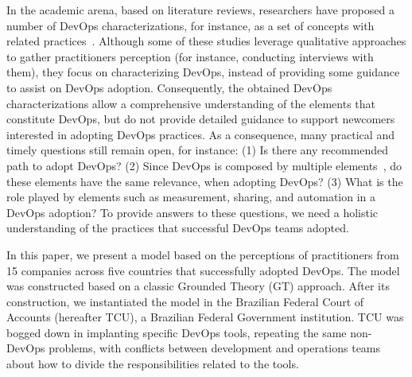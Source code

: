In the academic arena, based on literature reviews, researchers have proposed a
number of DevOps characterizations, for instance, as a set of concepts with
related
practices~\cite{cooperation_dev_ops_esem_2014,devops_a_definition_xp_15,dimensions_of_devops_xp_15,extending_dimensions_icsea_16,characterizing_devops_sbes_2016,qualitative_devops_journalsw_17}. Although some
of these studies leverage qualitative approaches to gather practitioners perception (for instance,
conducting interviews with them), they focus on characterizing DevOps,
instead of providing some guidance to assist on DevOps adoption. Consequently,
the obtained DevOps characterizations allow a comprehensive understanding of
the elements that constitute DevOps, but do not provide detailed guidance to
support newcomers interested in adopting DevOps practices.
As a consequence, many practical and timely questions still remain open, for
instance: (1) Is there any recommended path to adopt DevOps? (2) Since
DevOps is composed by multiple elements~\cite{dimensions_of_devops_xp_15}, do
these elements have the same relevance, when adopting DevOps?
(3) What is the role played by elements such as measurement, sharing, and automation
in a DevOps adoption? To provide answers to these questions, we need a holistic
understanding of the practices that successful DevOps teams adopted.

In this paper, we present a model based on the perceptions of practitioners from
15 companies across five countries that successfully adopted DevOps. The model
was constructed based on a classic Grounded Theory (GT) approach. After its
construction, we instantiated the model in the Brazilian Federal Court of
Accounts (hereafter TCU), a Brazilian Federal Government institution. TCU was
bogged down in implanting specific DevOps tools, repeating the same non-DevOps
problems, with conflicts between development and operations teams about how to
divide the responsibilities related to the tools.


